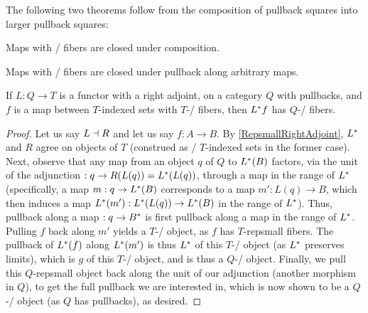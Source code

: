 The following two theorems follow from the composition of pullback squares into larger pullback squares: 

\begin{theorem}
Maps with \repsmall/ fibers are closed under composition.
\end{theorem}

\begin{theorem}
Maps with \repsmall/ fibers are closed under pullback along arbitrary maps.
\end{theorem}

\begin{theorem}\label{RepSmallRightAdjointFibers}
If $L : Q \to T$ is a functor with a right adjoint, on a category $Q$ with pullbacks, and $f$ is a map between $T$-indexed sets with $T$-\repsmall/ fibers, then $L^* f$ has $Q$-\repsmall/ fibers.
\end{theorem}
\begin{proof}
Let us say $L \dashv R$ and let us say $f: A \to B$. By \cref{RepsmallRightAdjoint}, $L^*$ and $R$ agree on objects of $T$ (construed as \repsmall/ $T$-indexed sets in the former case). Next, observe that any map from an object $q$ of $Q$ to $L^*(B)$ factors, via the unit of the adjunction $: q \to R(L(q)) = L^*(L(q))$, through a map in the range of $L^*$ (specifically, a map $m: q \to L^*(B)$ corresponds to a map $m': L(q) \to B$, which then induces a map $L^*(m'): L^*(L(q)) \to L^*(B)$ in the range of $L^*$). Thus, pullback along a map $: q \to B^*$ is first pullback along a map in the range of $L^*$. Pulling $f$ back along $m'$ yields a $T$-\repsmall/ object, as $f$ has $T$-repsmall fibers. The pullback of $L^*(f)$ along $L^*(m')$ is thus $L^*$ of this $T$-\repsmall/ object (as $L^*$ preserves limits), which is $g$ of this $T$-\repsmall/ object, and is thus a $Q$-\repsmall/ object. Finally, we pull this $Q$-repsmall object back along the unit of our adjunction (another morphism in $Q$), to get the full pullback we are interested in, which is now shown to be a $Q$-\repsmall/ object (as $Q$ has pullbacks), as desired. 
\end{proof}

